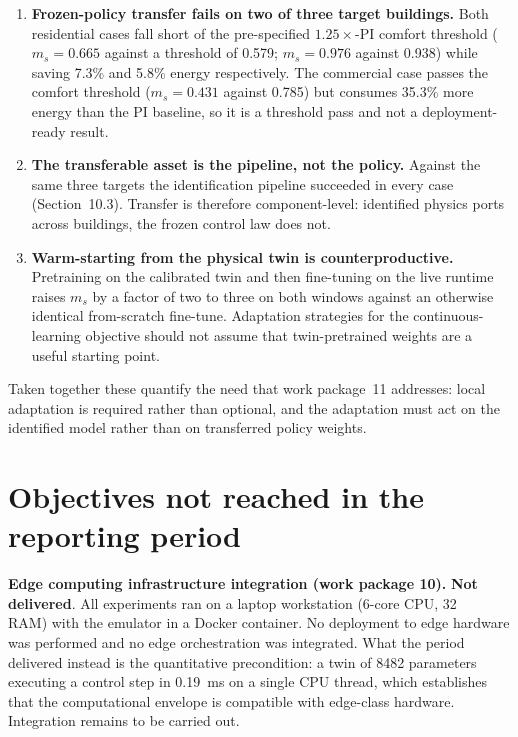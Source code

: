 \documentclass[11pt,a4paper]{article}
\newcommand{\ms}{\ensuremath{m_s}}
\newcommand{\notdone}{\textcolor{black!70}{\textbf{Not delivered}}}
\begin{document}
\begin{enumerate}[leftmargin=1.4em,itemsep=3pt]
\item \textbf{Frozen-policy transfer fails on two of three target buildings.} Both residential
cases fall short of the pre-specified $1.25\times$-PI comfort threshold ($\ms = 0.665$ against a
threshold of 0.579; $\ms = 0.976$ against 0.938) while saving 7.3\% and 5.8\% energy
respectively. The commercial case passes the comfort threshold ($\ms = 0.431$ against 0.785) but
consumes 35.3\% more energy than the PI baseline, so it is a threshold pass and not a
deployment-ready result.

\item \textbf{The transferable asset is the pipeline, not the policy.} Against the same three
targets the identification pipeline succeeded in every case (Section~10.3). Transfer is therefore
component-level: identified physics ports across buildings, the frozen control law does not.

\item \textbf{Warm-starting from the physical twin is counterproductive.} Pretraining on the
calibrated twin and then fine-tuning on the live runtime raises \ms{} by a factor of two to three
on both windows against an otherwise identical from-scratch fine-tune. Adaptation strategies for
the continuous-learning objective should not assume that twin-pretrained weights are a useful
starting point.
\end{enumerate}

Taken together these quantify the need that work package~11 addresses: local adaptation is
required rather than optional, and the adaptation must act on the identified model rather than on
transferred policy weights.

\section*{Objectives not reached in the reporting period}

\textbf{Edge computing infrastructure integration (work package 10).} \notdone. All experiments
ran on a laptop workstation (6-core CPU, \SI{32}{\giga\byte} RAM) with the emulator in a Docker
container. No deployment to edge hardware was performed and no edge orchestration was
integrated. What the period delivered instead is the quantitative precondition: a twin of 8482
parameters executing a control step in \SI{0.19}{\milli\second} on a single CPU thread, which
establishes that the computational envelope is compatible with edge-class hardware. Integration
remains to be carried out.
\end{document}
